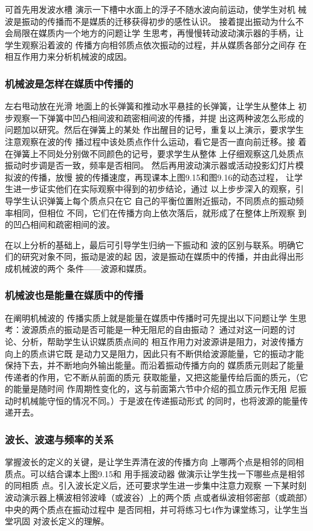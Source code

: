 可首先用发波水槽
演示一下槽中水面上的浮子不随水波向前运动，使学生对机
械波是振动的传播而不是媒质的迁移获得初步的感性认识。
接着提出振动为什么不会局限在媒质内一个地方的问题让学
生思考，再慢慢转动波动演示器的手柄，让学生观察沿着波的
传播方向相邻质点依次振动的过程，并从媒质各部分之间存
在相互作用力来分析机械波的成因。

\subsubsection{机械波是怎样在媒质中传播的}

左右甩动放在光滑
地面上的长弹簧和推动水平悬挂的长弹簧，让学生从整体上
初步观察一下弹簧中凹凸相间波和疏密相间波的传播，并提
出这两种波怎么形成的问题加以研究。然后在弹簧上的某处
作出醒目的记号，重复以上演示，要求学生注意观察在波的传
播过程中该处质点作什么运动，看它是否一直向前迁移。接
着在弹簧上不同处分别做不同颜色的记号，要求学生从整体
上仔细观察这几处质点振动时步调是否一致，频率是否相同。
然后再用波动演示器或活动投影幻灯片模拟波的传播，放慢
披的传播速度，再现课本上图9.15和图9.16的动态过程，
让学生进一步证实他们在实际观察中得到的初步结论，通过
以上步步深入的观察，引导学生认识弹簧上每个质点只在它
自己的平衡位置附近振动，不同质点的振动频率相同，但相位
不同，它们在传播方向上依次落后，就形成了在整体上所观察
到的凹凸相间和疏密相间的波。

在以上分析的基础上，最后可引导学生归纳一下振动和
波的区别与联系。明确它们的研究对象不同，振动是波的起
因，波是振动在媒质中的传播，并由此得出形成机械波的两个
条件——波源和媒质。

\subsubsection{机械波也是能量在媒质中的传播}

在阐明机械波的
传播实质上就是能量在媒质中传播时可先提出以下问题让学
生思考：波源质点的振动是否可能是一种无阻尼的自由振动？
通过对这一问题的讨论、分析，帮助学生认识媒质质点间的
相互作用力对波源讲是阻力，对波传播方向上的质点讲它既
是动力又是阻力，因此只有不断供给波源能量，它的振动才能
保持下去，并不断地向外输出能量。而沿着振动传播方向的
媒质质元则起了能量传递者的作用，它不断从前面的质元
获取能量，又把这能量传给后面的质元，（它的能量是随时间
作周期性变化的，这与前面第六节中介绍的孤立质元作无阻
尼振动时机械能守恒的情况不同。）于是波在传递振动形式
的同时，也将波源的能量传递开去。

\subsubsection{波长、波速与频率的关系}
掌握波长的定义的关键，是让学生弄清在波的传播方向
上哪两个点是相邻的同相质点。可以结合课本上图9.15和
用手摇波动器 做演示让学生找一下哪些点是相邻的同相质
点。引入波长定义后，还可要求学生进一步集中注意力观察
一下某时刻波动演示器上横波相邻波峰（或波谷）上的两个质
点或者纵波相邻密部（或疏部）中央的两个质点在振动过程中
是否同相，并可将练习七4作为课堂练习，让学生当堂巩固
对波长定义的理解。

